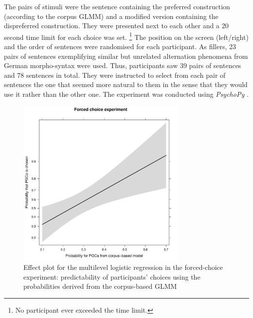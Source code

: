 \documentclass[USenglish]{article}
\begin{document}
The pairs of stimuli were the sentence containing the preferred construction (according to the corpus GLMM) and a modified version containing the dispreferred construction.
They were presented next to each other and a 20 second time limit for each choice was set.%
\footnote{No participant ever exceeded the time limit.}
The position on the screen (left\slash right) and the order of sentences were randomised for each participant.
As fillers, 23 pairs of sentences exemplifying similar but unrelated alternation phenomena from German morpho-syntax were used.
Thus, participants saw 39 pairs of sentences and 78 sentences in total.
They were instructed to select from each pair of sentences the one that seemed more natural to them in the sense that they would use it rather than the other one.
The experiment was conducted using \textit{PsychoPy} \citep{Peirce2007}.

\begin{figure}[hb!]
\centering
\includegraphics[width=0.75\textwidth]{../R/output/fc_effects}
\caption{Effect plot for the multilevel logistic regression in the forced-choice experiment: predictability of participants' choices using the probabilities derived from the corpus-based GLMM}
\label{fig:afc:effects}
\end{figure}
\end{document}
